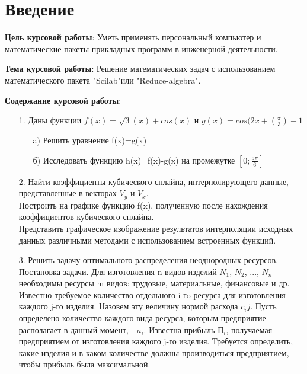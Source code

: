 \documentclass[russian,utf8,nocolumnxxxi,nocolumnxxxii]{eskdtext}
\begin{document}
\maketitle

\newpage
\tableofcontents

\newpage

\section{Введение}

\textbf{Цель курсовой работы}: Уметь применять персональный компьютер и математические пакеты прикладных программ в инженерной деятельности.

\textbf{Тема курсовой работы}: Решение математических задач с использованием математического пакета
"Scilab"или "Reduce-algebra".

\textbf{Содержание курсовой работы}:
\begin{enumerate}
    \item[1.] Даны функции $f(x)=\sqrt{3}(x)+cos(x)$ и $g(x)=cos(2x+(\frac{\pi}{3})-1$
\begin{enumerate}
    \item[a)] Решить уравнение f(x)=g(x)
    \item[б)] Исследовать функцию h(x)=f(x)-g(x) на промежутке $[0;\frac{5\pi}{6}]$
\end{enumerate}
    \item[2.] Найти коэффициенты кубического сплайна, интерполирующего данные, представленные в векторах $V_y$ и $V_x$.
    \\Построить на графике функцию f(x), полученную после нахождения коэффициентов кубического сплайна.
    \\Представить графическое изображение результатов интерполяции исходных данных различными методами с использованием встроенных функций.
    \item[3.]Решить задачу оптимального распределения неоднородных ресурсов. Постановка задачи. Для изготовления n видов изделий $N_1$, $N_2$, ..., $N_n$ необходимы ресурсы m видов: трудовые, материальные, финансовые и др. Известно требуемое количество отдельного i-гo ресурса для изготовления каждого j-го изделия. Назовем эту величину нормой расхода  $c_ij$. Пусть определено количество каждого вида ресурса, которым предприятие располагает в данный момент, - $a_i$. Известна прибыль $П_i$, получаемая предприятием от изготовления каждого j-го изделия. Требуется определить, какие изделия и в каком количестве должны производиться предприятием, чтобы прибыль была максимальной.
\end{enumerate}
\end{document}
